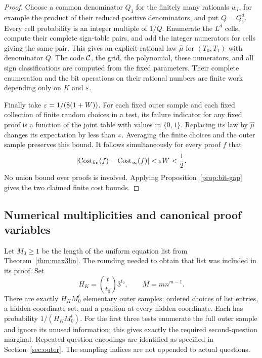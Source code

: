 \begin{proof}
Choose a common denominator $Q_1$ for the finitely many rationals $w_I$,
for example the product of their reduced positive denominators, and put
$Q=Q_1^d$. Every cell probability is an integer multiple of $1/Q$.
Enumerate the $L^d$ cells, compute their complete sign-table pairs, and
add the integer numerators for cells giving the same pair. This gives
an explicit rational law $\widehat\mu$ for $(T_0,T_1)$ with denominator
$Q$. The code $\mathcal C$, the grid, the polynomial, these numerators, and all
sign classifications are computed from the fixed parameters. Their
complete enumeration and the bit operations on their rational numbers
are finite work depending only on $K$ and $\varepsilon$.

Finally take $\varepsilon=1/(8(1+W))$. For each fixed outer sample and each
fixed collection of finite random choices in a test, its failure
indicator for any fixed proof is a function of the joint table with
values in $\{0,1\}$. Replacing its law by $\widehat\mu$ changes its
expectation by less than $\varepsilon$. Averaging the finite choices and the
outer sample preserves this bound. It follows simultaneously for every
proof $f$ that
\[
 \lvert\operatorname{Cost}_{\mathrm{fin}}(f)-\operatorname{Cost}_\infty(f)\rvert
 <\varepsilon W<\frac12.
\]
No union bound over proofs is involved. Applying
Proposition~\ref{prop:bit-gap} gives the two claimed finite cost bounds.
\end{proof}

\subsection{Numerical multiplicities and canonical proof variables}

Let $M_0\ge1$ be the length of the uniform equation list from
Theorem~\ref{thm:max3lin}. The rounding needed to obtain that list was
included in its proof. Set
\[
 H_K=\binom{t}{t_0}3^{t_0},\qquad M=mn^{m-1}.
\]
There are exactly $H_KM_0^t$ elementary outer samples: ordered choices of
list entries, a hidden-coordinate set, and a position at every hidden
coordinate. Each has probability $1/(H_KM_0^t)$. For the first three
tests enumerate the full outer sample and ignore its unused information;
this gives exactly the required second-question marginal. Repeated
question encodings are identified as specified in Section~\ref{sec:outer}.
The sampling indices are not appended to actual questions.

